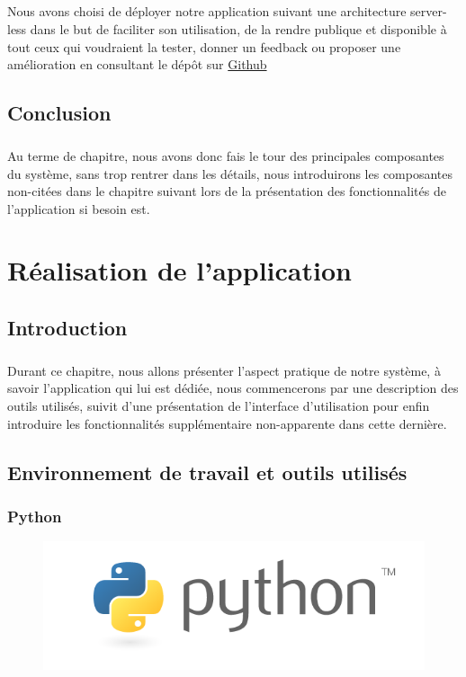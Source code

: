 \documentclass[]{report}
\begin{document}
		\paragraph{}
		Nous avons choisi de déployer notre application suivant une architecture server-less dans le but de faciliter son utilisation, de la rendre publique et disponible à tout ceux qui voudraient la tester, donner un feedback ou proposer une amélioration en consultant le dépôt sur \href{https://github.com/mohammedi-haroune/arabic-historical-dictionary-frontend}{Github}
	\section{Conclusion}
		\paragraph{}
		Au terme de chapitre, nous avons donc fais le tour des principales composantes du système, sans trop rentrer dans les détails, nous introduirons les composantes non-citées dans le chapitre suivant lors de la présentation des fonctionnalités de l'application si besoin est.  
\chapter{Réalisation de l'application}
	\section{Introduction}
		\paragraph{}
		Durant ce chapitre, nous allons présenter l'aspect pratique de notre système, à savoir l'application qui lui est dédiée, nous commencerons par une description des outils utilisés, suivit d'une présentation de l'interface d'utilisation pour enfin introduire les fonctionnalités supplémentaire non-apparente dans cette dernière.  
	\section{Environnement de travail et outils utilisés}
		\subsection{Python}
			\begin{figure}[H]
				\centering
				\includegraphics[width=0.25\linewidth]{images/python.png}
			\end{figure}
\end{document}
